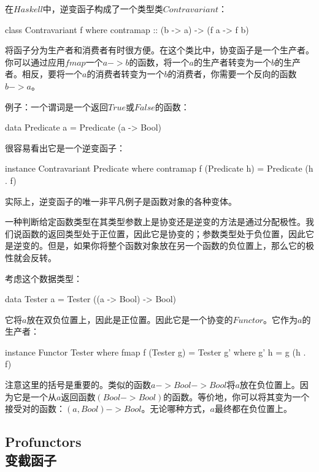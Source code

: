 \documentclass[DaoFP]{subfiles}
\begin{document}
    在$Haskell$中，逆变函子构成了一个类型类$Contravariant$：

    \begin{haskell}
        class Contravariant f where
        contramap :: (b -> a) -> (f a -> f b)
    \end{haskell}

    将函子分为生产者和消费者有时很方便。在这个类比中，协变函子是一个生产者。你可以通过应用$fmap$一个$a -> b$的函数，将一个$a$的生产者转变为一个$b$的生产者。相反，要将一个$a$的消费者转变为一个$b$的消费者，你需要一个反向的函数$b -> a$。

    例子：一个谓词是一个返回$True$或$False$的函数：

    \begin{haskell}
        data Predicate a = Predicate (a -> Bool)
    \end{haskell}

    很容易看出它是一个逆变函子：

    \begin{haskell}
        instance Contravariant Predicate where
        contramap f (Predicate h) = Predicate (h . f)
    \end{haskell}

    实际上，逆变函子的唯一非平凡例子是函数对象的各种变体。

    一种判断给定函数类型在其类型参数上是协变还是逆变的方法是通过分配极性。我们说函数的返回类型处于正位置，因此它是协变的；参数类型处于负位置，因此它是逆变的。但是，如果你将整个函数对象放在另一个函数的负位置上，那么它的极性就会反转。

    考虑这个数据类型：

    \begin{haskell}
        data Tester a = Tester ((a -> Bool) -> Bool)
    \end{haskell}

    它将$a$放在双负位置上，因此是正位置。因此它是一个协变的$Functor$。它作为$a$的生产者：

    \begin{haskell}
        instance Functor Tester where
        fmap f (Tester g) = Tester g'
        where g' h = g (h . f)
    \end{haskell}

    注意这里的括号是重要的。类似的函数$a -> Bool -> Bool$将$a$放在负位置上。因为它是一个从$a$返回函数$(Bool -> Bool)$的函数。等价地，你可以将其变为一个接受对的函数：$(a, Bool) -> Bool$。无论哪种方式，$a$最终都在负位置上。

    \subsection{Profunctors\\变截函子}
\end{document}

